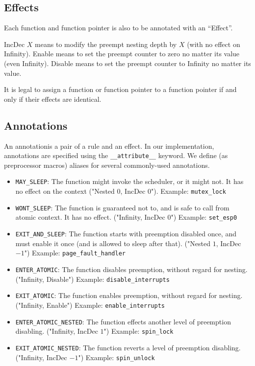 \documentclass{article}
\begin{document}
\subsection{Effects}

Each function and function pointer is also to be annotated with an ``Effect''.

{\sf IncDec $X$} means to modify the preempt nesting depth by $X$ (with no effect on {\sf Infinity}). {\sf Enable} means to set the preempt counter to zero no matter its value (even {\sf Infinity}). {\sf Disable} means to set the preempt counter to {\sf Infinity} no matter its value.

It is legal to assign a function or function pointer to a function pointer if and only if their effects are identical.

\subsection{Annotations}

An annotationis a pair of a rule and an effect. In our implementation, annotations are specified using the \texttt{\_\_attribute\_\_} keyword. We define (as preprocessor macros) aliases for several commonly-used annotations.

\begin{itemize}
	\item \texttt{MAY\_SLEEP}:
        The function might invoke the scheduler, or it might not. It has no
        effect on the context ("{\sf Nested} $0$, {\sf IncDec} $0$").  Example: \texttt{mutex\_lock}
	\item \texttt{WONT\_SLEEP}:
        The function is guaranteed not to, and is safe to call from atomic
        context. It has no effect. ("{\sf Infinity}, {\sf IncDec} $0$") Example: \texttt{set\_esp0}
	\item \texttt{EXIT\_AND\_SLEEP}:
        The function starts with preemption disabled once, and must enable it
        once (and is allowed to sleep after that). ("{\sf Nested} $1$, {\sf IncDec} $-1$")
        Example: \texttt{page\_fault\_handler}
	\item \texttt{ENTER\_ATOMIC}:
        The function disables preemption, without regard for nesting.
        ("{\sf Infinity}, {\sf Disable}") Example: \texttt{disable\_interrupts}
	\item \texttt{EXIT\_ATOMIC}:
        The function enables preemption, without regard for nesting.
        ("{\sf Infinity}, {\sf Enable}") Example: \texttt{enable\_interrupts}
	\item \texttt{ENTER\_ATOMIC\_NESTED}:
        The function effects another level of preemption disabling. ("{\sf Infinity},
        {\sf IncDec} $1$") Example: \texttt{spin\_lock}
	\item \texttt{EXIT\_ATOMIC\_NESTED}:
        The function reverts a level of preemption disabling. ("{\sf Infinity}, {\sf IncDec}
        $-1$") Example: \texttt{spin\_unlock}

\end{itemize}
\end{document}
